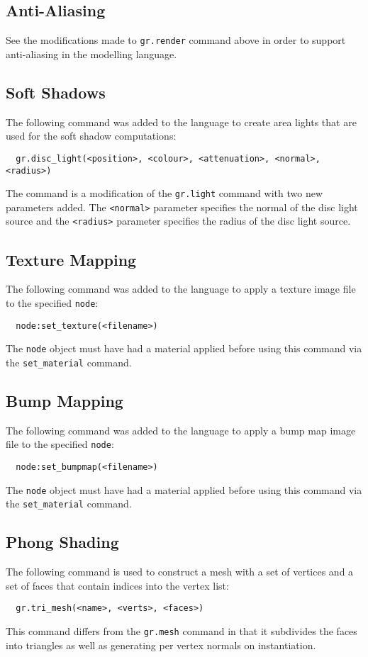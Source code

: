 \subsection*{Anti-Aliasing}
See the modifications made to \verb|gr.render| command above in order to support
anti-aliasing in the modelling language.

\subsection*{Soft Shadows}
The following command was added to the language to create area lights that are
used for the soft shadow computations:
\begin{lstlisting}
  gr.disc_light(<position>, <colour>, <attenuation>, <normal>, <radius>)
\end{lstlisting}
The command is a modification of the \verb|gr.light| command with two new
parameters added. The \verb|<normal>| parameter specifies the normal of the disc
light source and the \verb|<radius>| parameter specifies the radius of the disc
light source.

\subsection*{Texture Mapping}
The following command was added to the language to apply a texture image file
to the specified \verb|node|:
\begin{lstlisting}
  node:set_texture(<filename>)
\end{lstlisting}
The \verb|node| object must have had a material applied before using this
command via the \verb|set_material| command.

\subsection*{Bump Mapping}
The following command was added to the language to apply a bump map image file
to the specified \verb|node|:
\begin{lstlisting}
  node:set_bumpmap(<filename>)
\end{lstlisting}
The \verb|node| object must have had a material applied before using this
command via the \verb|set_material| command.

\subsection*{Phong Shading}
The following command is used to construct a mesh with a set of vertices and a
set of faces that contain indices into the vertex list:
\begin{lstlisting}
  gr.tri_mesh(<name>, <verts>, <faces>)
\end{lstlisting}
This command differs from the \verb|gr.mesh| command in that it subdivides the
faces into triangles as well as generating per vertex normals on instantiation.

